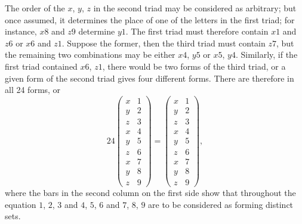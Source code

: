 \documentclass[11pt,a4paper]{book}
\begin{document}
The order of the $x$, $y$, $z$ in the second triad may be considered as arbitrary; but once assumed, it determines the place of one of the letters in the first triad; for instance, $x8$ and $z9$ determine $y1$. The first triad must therefore contain $x1$ and $z6$ or $x6$ and $z1$. Suppose the former, then the third triad must contain $z7$, but the remaining two combinations may be either $x4$, $y5$ or $x5$, $y4$. Similarly, if the first triad contained $x6$, $z1$, there would be two forms of the third triad, or a given form of the second triad gives four different forms. There are therefore in all 24 forms, or
\[24 \begin{pmatrix} x & 1 \\ y & 2 \\ z & 3 \\ \hline x & 4 \\ y & 5 \\ z & 6 \\ \hline x & 7 \\ y & 8 \\ z & 9 \end{pmatrix} = \begin{pmatrix} x & 1 \\ y & 2 \\ z & 3 \\ \hline x & 4 \\ y & 5 \\ z & 6 \\ \hline x & 7 \\ y & 8 \\ z & 9 \end{pmatrix},\]
where the bars in the second column on the first side show that throughout the equation $1$, $2$, $3$ and $4$, $5$, $6$ and $7$, $8$, $9$ are to be considered as forming distinct sets.
\end{document}
